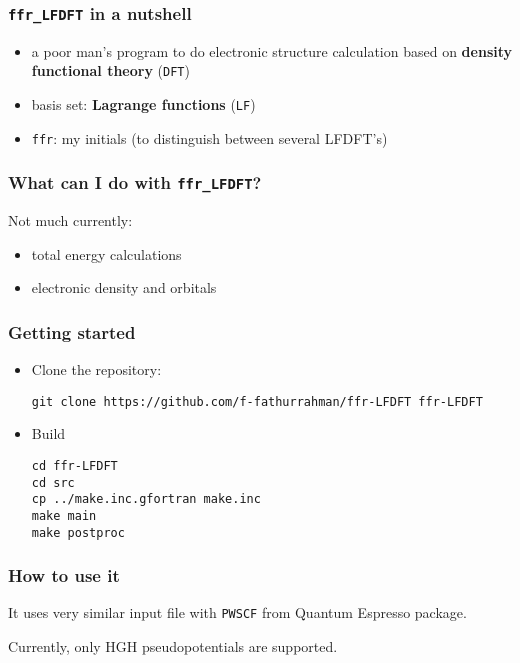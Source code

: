 \documentclass{beamer}
\begin{document}
\begin{frame}
\frametitle{\texttt{ffr\_LFDFT} in a nutshell}

\begin{itemize}
\item a poor man's program to do electronic structure calculation based on
\textbf{density functional theory} (\texttt{DFT})
\item basis set: \textbf{Lagrange functions} (\texttt{LF})
\item \texttt{ffr}: my initials (to distinguish between several LFDFT's)
\end{itemize}

\end{frame}


\begin{frame}
\frametitle{What can I do with \texttt{ffr\_LFDFT}?}

Not much currently:
\begin{itemize}
\item total energy calculations
\item electronic density and orbitals
\end{itemize}

\end{frame}


\begin{frame}[fragile]
\frametitle{Getting started}

\begin{itemize}

\item Clone the repository:
\begin{verbatim}
git clone https://github.com/f-fathurrahman/ffr-LFDFT ffr-LFDFT
\end{verbatim}

\item Build
\begin{verbatim}
cd ffr-LFDFT
cd src
cp ../make.inc.gfortran make.inc
make main
make postproc
\end{verbatim}

\end{itemize}

\end{frame}


\begin{frame}
\frametitle{How to use it}

It uses very similar input file with \texttt{PWSCF} from Quantum Espresso
package.

Currently, only HGH pseudopotentials are supported.

\end{frame}
\end{document}
